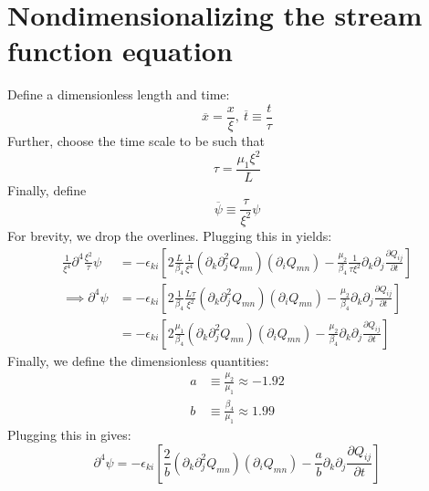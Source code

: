 \documentclass[reqno]{article}
\begin{document}
\section{Nondimensionalizing the stream function equation}
Define a dimensionless length and time:
\begin{equation}
	\overline{x} = \frac{x}{\xi}, \: \overline{t} \equiv \frac{t}{\tau}
\end{equation}
Further, choose the time scale to be such that
\begin{equation}
	\tau = \frac{\mu_1 \xi^2}{L}
\end{equation}
Finally, define 
\begin{equation}
	\overline{\psi} \equiv \frac{\tau}{\xi^2} \psi
\end{equation}
For brevity, we drop the overlines.
Plugging this in yields:
\begin{equation}
\begin{split}
	\frac{1}{\xi^4} \partial^4 \frac{\xi^2}{\tau} \psi
	&= -\epsilon_{ki} \left[
	2 \frac{L}{\beta_4} \frac{1}{\xi^4} 
	\left( \partial_k \partial_j^2 Q_{mn} \right)
	\left( \partial_i Q_{mn} \right)
	- \frac{\mu_2}{\beta_4} \frac{1}{\tau \xi^2} \partial_k \partial_j \frac{\partial Q_{ij}}{\partial t}
	\right] \\
	\implies \partial^4 \psi
	&= -\epsilon_{ki} \left[
	2 \frac{1}{\beta_4} \frac{L \tau}{\xi^2} 
	\left( \partial_k \partial_j^2 Q_{mn} \right)
	\left( \partial_i Q_{mn} \right)
	- \frac{\mu_2}{\beta_4} \partial_k \partial_j \frac{\partial Q_{ij}}{\partial t}
	\right] \\
	&= -\epsilon_{ki} \left[
	2 \frac{\mu_1}{\beta_4} 
	\left( \partial_k \partial_j^2 Q_{mn} \right)
	\left( \partial_i Q_{mn} \right)
	- \frac{\mu_2}{\beta_4} \partial_k \partial_j \frac{\partial Q_{ij}}{\partial t}
	\right]
\end{split}
\end{equation}
Finally, we define the dimensionless quantities:
\begin{equation}
\begin{split}
	a &\equiv \frac{\mu_2}{\mu_1} \approx -1.92 \\
	b &\equiv \frac{\beta_4}{\mu_1} \approx 1.99
\end{split}
\end{equation}
Plugging this in gives:
\begin{equation}
	\partial^4 \psi
	= -\epsilon_{ki} \left[
	\frac{2}{b} \left( \partial_k \partial_j^2 Q_{mn} \right)
	\left( \partial_i Q_{mn} \right)
	- \frac{a}{b} \partial_k \partial_j \frac{\partial Q_{ij}}{\partial t}
	\right]
\end{equation}
\end{document}
